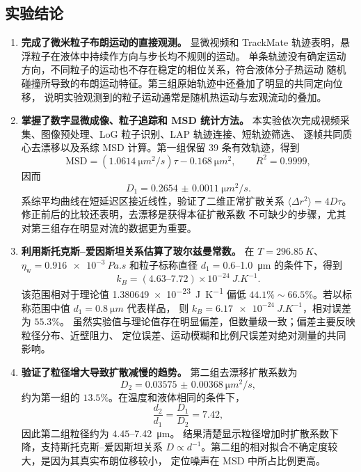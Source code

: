 \documentclass[11pt]{article}
\begin{document}
\subsection{实验结论}

\begin{enumerate}
    \item \textbf{完成了微米粒子布朗运动的直接观测。}
    显微视频和 TrackMate 轨迹表明，悬浮粒子在液体中持续作方向与步长均不规则的运动。
    单条轨迹没有确定运动方向，不同粒子的运动也不存在稳定的相位关系，符合液体分子热运动
    随机碰撞所导致的布朗运动特征。第三组原始轨迹中还叠加了明显的共同定向位移，
    说明实验观测到的粒子运动通常是随机热运动与宏观流动的叠加。

    \item \textbf{掌握了数字显微成像、粒子追踪和 MSD 统计方法。}
    本实验依次完成视频采集、图像预处理、LoG 粒子识别、LAP 轨迹连接、短轨迹筛选、
    逐帧共同质心去漂移以及系综 MSD 计算。第一组保留 39 条有效轨迹，得到
    \begin{equation}
        \mathrm{MSD}=(1.0614\ \si{\micro m^2/s})\tau
        -\SI{0.168}{\micro m^2},
        \qquad R^2=0.9999,
    \end{equation}
    因而
    \begin{equation}
        D_1=\SI{0.2654(11)}{\micro m^2/s}.
    \end{equation}
    系综平均曲线在短延迟区接近线性，验证了二维正常扩散关系
    $\langle\Delta r^2\rangle=4D\tau$。修正前后的比较还表明，去漂移是获得本征扩散系数
    不可缺少的步骤，尤其对第三组存在明显对流的数据更为重要。

    \item \textbf{利用斯托克斯--爱因斯坦关系估算了玻尔兹曼常数。}
    在 $T=\SI{296.85}{K}$、$\eta_{\mathrm w}=\SI{0.916e-3}{Pa.s}$ 和粒子标称直径
    $d_1=0.6$--\SI{1.0}{\micro m} 的条件下，得到
    \begin{equation}
        k_B=(4.63\text{--}7.72)\times10^{-24}\ \si{J.K^{-1}}.
    \end{equation}
    该范围相对于理论值 \SI{1.380649e-23}{J.K^{-1}} 偏低
    $44.1\%\sim66.5\%$。若以标称范围中值 $d_1=\SI{0.8}{\micro m}$ 代表样品，
    则 $k_B=\SI{6.17e-24}{J.K^{-1}}$，相对误差为 $55.3\%$。
    虽然实验值与理论值存在明显偏差，但数量级一致；偏差主要反映粒径分布、近壁阻力、
    定位误差、运动模糊和比例尺误差对绝对测量的共同影响。

    \item \textbf{验证了粒径增大导致扩散减慢的趋势。}
    第二组去漂移扩散系数为
    \begin{equation}
        D_2=\SI{0.03575(368)}{\micro m^2/s},
    \end{equation}
    约为第一组的 $13.5\%$。在温度和液体相同的条件下，
    \begin{equation}
        \frac{d_2}{d_1}=\frac{D_1}{D_2}=7.42,
    \end{equation}
    因此第二组粒径约为 $4.45$--\SI{7.42}{\micro m}。
    结果清楚显示粒径增加时扩散系数下降，支持斯托克斯--爱因斯坦关系
    $D\propto d^{-1}$。第二组的相对拟合不确定度较大，是因为其真实布朗位移较小，
    定位噪声在 MSD 中所占比例更高。


\end{enumerate}
\end{document}
